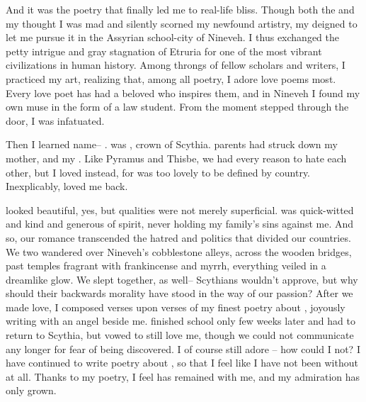 \documentclass[char]{Kos}
\begin{document}
And it was the poetry that finally led me to real-life bliss. Though both the \cEtruriaKing{\monarch} and my \cGroom{} thought I was mad and silently scorned my newfound artistry, my \cEtruriaKing{\parent} deigned to let me pursue it in the Assyrian school-city of Nineveh. I thus exchanged the petty intrigue and gray stagnation of Etruria for one of the most vibrant civilizations in human history. Among throngs of fellow scholars and writers, I practiced my art, realizing that, among all poetry, I adore love poems most. Every love poet has had a beloved who inspires them, and in Nineveh I found my own muse in the form of a law student. From the moment \cBride{\they} stepped through the door, I was infatuated.

Then I learned \cBride{\their} name-- \cBride{}. \cBride{\They} was \cBride{}, crown \cBride{\prince} of Scythia. \cBride{\Their} parents had struck down my mother, and my \cEtruriaKing{\parent} \cBride{\their} \cFugitive{\sibling}. Like Pyramus and Thisbe, we had every reason to hate each other, but I loved \cBride{\them} instead, for \cBride{\they} was too lovely to be defined by \cBride{\their} country. Inexplicably, \cBride{\they} loved me back.

\cBride{} looked beautiful, yes, but \cBride{\their} qualities were not merely superficial. \cBride{\They} was quick-witted and kind and generous of spirit, never holding my family's sins against me. And so, our romance transcended the hatred and politics that divided our countries. We two wandered over Nineveh's cobblestone alleys, across the wooden bridges, past temples fragrant with frankincense and myrrh, everything veiled in a dreamlike glow. We slept together, as well-- Scythians wouldn't approve, but why should their backwards morality have stood in the way of our passion? After we made love, I composed verses upon verses of my finest poetry about \cBride{\them}, joyously writing with an angel beside me. \cBride{\They} finished school only few weeks later and had to return to Scythia, but \cBride{\they} vowed to still love me, though we could not communicate any longer for fear of being discovered. I of course still adore \cBride{\them}-- how could I not? I have continued to write poetry about \cBride{\them}, so that I feel like I have not been without \cBride{\them} at all. Thanks to my poetry, I feel \cBride{\they} has remained with me, and my admiration has only grown.
\end{document}
